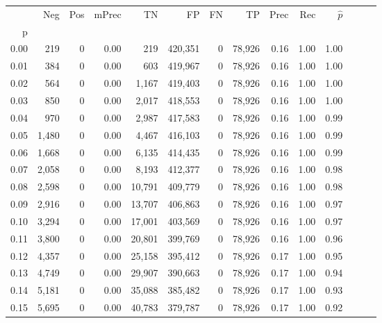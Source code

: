 \begin{tabular}{rrrrrrrrrrrrrr}
\toprule
{} &    Neg &    Pos & mPrec &       TN &       FP &      FN &      TP &  Prec &   Rec & $\hat{p}$ \\
p    &        &        &       &          &          &         &         &       &       &           \\
\midrule
0.00 &    219 &      0 &  0.00 &      219 &  420,351 &       0 &  78,926 &  0.16 &  1.00 &      1.00 \\
0.01 &    384 &      0 &  0.00 &      603 &  419,967 &       0 &  78,926 &  0.16 &  1.00 &      1.00 \\
0.02 &    564 &      0 &  0.00 &    1,167 &  419,403 &       0 &  78,926 &  0.16 &  1.00 &      1.00 \\
0.03 &    850 &      0 &  0.00 &    2,017 &  418,553 &       0 &  78,926 &  0.16 &  1.00 &      1.00 \\
0.04 &    970 &      0 &  0.00 &    2,987 &  417,583 &       0 &  78,926 &  0.16 &  1.00 &      0.99 \\
0.05 &  1,480 &      0 &  0.00 &    4,467 &  416,103 &       0 &  78,926 &  0.16 &  1.00 &      0.99 \\
0.06 &  1,668 &      0 &  0.00 &    6,135 &  414,435 &       0 &  78,926 &  0.16 &  1.00 &      0.99 \\
0.07 &  2,058 &      0 &  0.00 &    8,193 &  412,377 &       0 &  78,926 &  0.16 &  1.00 &      0.98 \\
0.08 &  2,598 &      0 &  0.00 &   10,791 &  409,779 &       0 &  78,926 &  0.16 &  1.00 &      0.98 \\
0.09 &  2,916 &      0 &  0.00 &   13,707 &  406,863 &       0 &  78,926 &  0.16 &  1.00 &      0.97 \\
0.10 &  3,294 &      0 &  0.00 &   17,001 &  403,569 &       0 &  78,926 &  0.16 &  1.00 &      0.97 \\
0.11 &  3,800 &      0 &  0.00 &   20,801 &  399,769 &       0 &  78,926 &  0.16 &  1.00 &      0.96 \\
0.12 &  4,357 &      0 &  0.00 &   25,158 &  395,412 &       0 &  78,926 &  0.17 &  1.00 &      0.95 \\
0.13 &  4,749 &      0 &  0.00 &   29,907 &  390,663 &       0 &  78,926 &  0.17 &  1.00 &      0.94 \\
0.14 &  5,181 &      0 &  0.00 &   35,088 &  385,482 &       0 &  78,926 &  0.17 &  1.00 &      0.93 \\
0.15 &  5,695 &      0 &  0.00 &   40,783 &  379,787 &       0 &  78,926 &  0.17 &  1.00 &      0.92 \\

\end{tabular}
